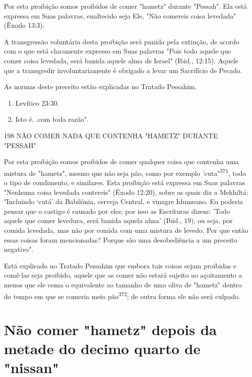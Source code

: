 \begin{itemize}
\begin{enumrate}
\begin{itemize}
\begin{itemize}
\begin{itemize}
Por esta proibição somos proibidos de comer "hametz" durante "Pes­sah".
Ela está expressa em Suas palavras, enaltecido seja Ele, "Não comereis
coisa levedada" (Êxodo 13:3).

A transgressão voluntária desta proibição será punida pela extinção, de
acordo com o que está claramente expresso em Suas palavras "Pois todo
aquele que comer coisa levedada, será banida aquele alma de Israel"
(Ibid., 12:15). Aquele que a transgredir involuntariamente é obrigado a
levar um Sa­crifício de Pecado.


As normas deste preceito estão explicadas no Tratado Pessahim.

\begin{enumerate}
\def\labelenumi{\arabic{enumi}.}
\setcounter{enumi}{368}
\item
 
 Levítico 23:30.
 
\item
 
 Isto é. .com toda razão".
 
\end{enumerate}

198 NÃO COMER NADA QUE CONTENHA "HAMETZ" DURANTE "PESSAH"

Por esta proibição somos proibidos de comer qualquer coisa que con­tenha
uma mistura de "hametz", mesmo que não seja pão, como por exemplo
'cuta"\textsuperscript{371}, todo o tipo de condimento, e similares.
Esta proibição está expres­sa em Suas palavras "Nenhuma coisa levedada
contereis" (Êxodo 12:20), sobre as quais diz a Mekhiltá: "Incluindo
`cutá' da Babilônia, cerveja Central, e vina­gre Idumeano. Eu poderia
pensar que o castigo é causado por eles; por isso as Escrituras dizem:
'Todo aquele que comer levedura, será banida aquela al­ma' (Ibid., 19),
ou seja, por comida levedada, mas não por comida com uma mistura de
levedo. Por que então essas coisas foram mencionadas? Porque são uma
desobediência a um preceito negativo".

Está explicado no Tratado Pessahim que embora tais coisas sejam
proibidas e comê-las seja proibido, aquele que as comer não estará
sujeito ao açoitamento a menos que ele coma o equivalente ao tamanho de
uma oliva de "hametz" dentro do tempo em que se comeria meio
pão\textsuperscript{372}; de outra forma ele não será culpado.

\section{Não comer "hametz" depois da metade do decimo quarto de "nissan"}


\end{itemize}
\end{itemize}
\end{itemize}
\end{enumrate}
\end{itemize}
